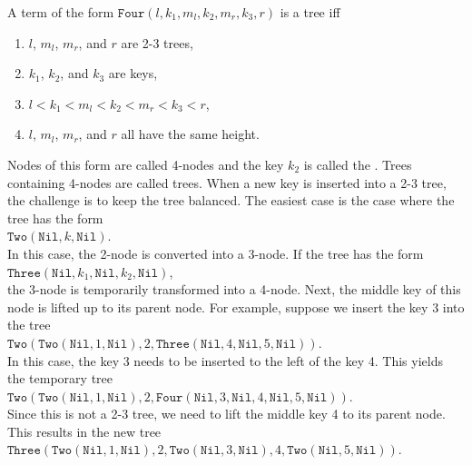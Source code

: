 A term of the form $\mathtt{Four}(l,k_1,m_l, k_2, m_r, k_3, r)$ is a  tree iff
\begin{enumerate}
\item $l$, $m_l$, $m_r$, and $r$ are 2-3 trees,
\item $k_1$, $k_2$, and $k_3$ are keys,
\item $l < k_1 < m_l < k_2 < m_r < k_3 < r$,
\item $l$, $m_l$, $m_r$, and $r$ all have the same height.
\end{enumerate}
Nodes of this form are called 4-nodes and the key $k_2$ is called the .
Trees containing 4-nodes are called  trees.
When a new key is inserted into a 2-3 tree, the challenge is to keep the tree balanced.  The easiest
case is the case where the tree has the form
\\[0.2cm]
\hspace*{1.3cm}
$\mathtt{Two}(\mathtt{Nil}, k, \mathtt{Nil})$.
\\[0.2cm]
In this case, the 2-node is converted into a 3-node.  If the tree has the form 
\\[0.2cm]
\hspace*{1.3cm}
$\mathtt{Three}(\mathtt{Nil}, k_1, \mathtt{Nil}, k_2, \mathtt{Nil})$,
\\[0.2cm]
the 3-node is temporarily transformed into a 4-node.  Next, the middle key of this node is lifted up
to its parent node.  For example, suppose we insert the key 3 into the tree
\\[0.2cm]
\hspace*{1.3cm}
$\mathtt{Two}(\mathtt{Two}(\mathtt{Nil}, 1, \mathtt{Nil}), 2, \mathtt{Three}(\mathtt{Nil}, 4, \mathtt{Nil}, 5, \mathtt{Nil}))$.
\\[0.2cm]
In this case, the key 3 needs to be inserted to the left of the key 4.  This yields the temporary tree 
\\[0.2cm]
\hspace*{1.3cm}
$\mathtt{Two}(\mathtt{Two}(\mathtt{Nil}, 1, \mathtt{Nil}), 2, \mathtt{Four}(\mathtt{Nil}, 3, \mathtt{Nil}, 4, \mathtt{Nil}, 5, \mathtt{Nil}))$.
\\[0.2cm]
Since this is not a 2-3 tree, we need to lift the middle key 4 to its parent node.  This results in
the new tree
\\[-0.1cm]
\hspace*{1.3cm}
$\mathtt{Three}(\mathtt{Two}(\mathtt{Nil}, 1, \mathtt{Nil}), 2, \mathtt{Two}(\mathtt{Nil}, 3, \mathtt{Nil}), 4, \mathtt{Two}(\mathtt{Nil}, 5, \mathtt{Nil}))$.
